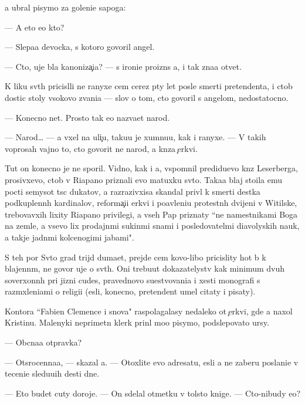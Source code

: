 \documentclass[10pt]{book}
\begin{document}
{\Y}a ubral pisymo za goleni{\x}e sapoga:

— A eto {\y}e{\x}o kto?

— Slepa{\y}a devocka, s kotoro{\y} govoril angel.

— Cto, uje b{\yi}la kanoniza{\c}i{\y}a? — s ironi{\y}e{\y} proizn{\e}s {\y}a, i tak zna{\y}a otvet.

K liku sv{\ia}t{\yi}h pricisl{\ia}li ne ranyxe cem cerez p{\ia}ty let posle smerti pretendenta, i ctob{\yi} dostic stoly v{\yi}\-so\-ko\-vo zvani{\y}a — slov o tom, cto govoril s angelom, nedostatocno.

— Konecno net. Prosto tak {\y}e{\y}o naz{\yi}va{\y}et narod.

— Narod… — {\Y}a v{\yi}xel na uli{\c}u, taku{\y}u je xumnu{\y}u, kak i ranyxe. — V takih voprosah vajno to, cto govorit ne narod, a kn{\ia}z{\y}a {\c}erkvi.

Tut on konecno je ne sporil. Vidno, kak i {\y}a, vspomnil predidu{\x}evo kn{\ia}z{\ia} Leserberga, prosivxevo, ctob{\yi} v Riapano priznali {\y}evo matuxku sv{\ia}to{\y}. Taka{\y}a blaj stoila {\y}emu pocti semysot t{\yi}s{\ia}c dukatov, a razrazivxi{\y}sa skandal priv{\e}l k smerti des{\ia}tka podkuplenn{\yi}h kardinalov, reforma{\c}i{\y}i {\C}erkvi i po{\y}avleni{\y}u protestn{\yi}h dvijeni{\y} v Witilske, trebovavxih lixity Riapano privilegi{\y}, a vseh Pap priznaty ``ne namestnikami Boga na zemle, a vsevo lix prodajn{\yi}mi sukin{\yi}mi s{\yi}nami i posledovatel{\ia}mi diavoly\-skih nauk, a takje jadn{\yi}mi kolcenogimi jabami".

S teh por Sv{\ia}to{\y} grad trijd{\yi} duma{\y}et, prejde cem kovo-libo pricislity hot{\ia} b{\yi} k blajenn{\yi}m, ne go\-vo\-r{\ia} uje o sv{\ia}t{\yi}h. Oni trebu{\y}ut dokazatelystv kak minimum dvuh soverxonn{\yi}h pri jizni cudes, pravednovo su{\x}estvovani{\y}a i xesti monografi{\y} s razm{\yi}xleni{\y}ami o religi{\y}i ({\y}esli, konecno, pretendent umel citaty i pisaty).

Kontora ``Fabien Clemence i s{\yi}nov{\y}a" raspolagalasy nedaleko ot {\c}erkvi, gde {\y}a naxol Kristinu. Malenyki{\y} neprimetn{\yi}{\y} klerk prin{\ia}l mo{\y}o pisymo, podslepovato {\x}ur{\ia}sy.

— Ob{\yi}cna{\y}a otpravka?

— Otsrocenna{\y}a, — skazal {\y}a. — Otoxlite {\y}evo adresatu, {\y}esli {\y}a ne zaberu po\-sla\-ni\-{\y}e v teceni{\y}e sledu{\y}u{\x}ih des{\ia}ti dne{\y}.

— Eto budet cuty doroje. — On sdelal otmetku v tolsto{\y} knige. — Cto-nibudy {\y}e{\x}o?
\end{document}
